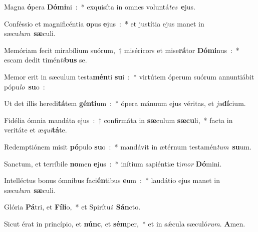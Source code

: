 ﻿\item Magna \textbf{ó}\-pera \textbf{Dó}\-\textbf{mi}\-ni~:~* exquisíta in omnes voluntá\emph{tes}\ \textbf{e}jus.
\item Conféssio et magnificéntia \textbf{o}\-pus \textbf{e}\-jus~:~* et justítia ejus manet in sæcu\emph{lum}\ \textbf{sæ}culi.
\item Memóriam fecit mi\-ra\-bí\-li\-um suórum,~† mi\-sé\-ri\-cors et mi\-se\textbf{rá}\-tor \textbf{Dó}\-\textbf{mi}\-nus~:~* escam dedit timén\emph{ti}\-\textbf{bus} se.
\item Memor erit in sæculum te\-sta\-\textbf{mén}\-ti \textbf{su}\-i~:~* virtútem óperum suórum annuntiábit pópu\emph{lo}\ \textbf{su}o~:
\item Ut det illis heredi\textbf{tá}\-tem \textbf{gén}\-\textbf{ti}\-um~:~* ópera mánuum ejus véritas, et \emph{ju}\textbf{dí}cium.
\item Fidélia ómnia mandáta ejus~:~† confirmáta in \textbf{sæ}\-culum \textbf{sæ}\-\textbf{cu}\-li,~* facta in veritáte et æ\emph{qui}\textbf{tá}te.
\item Redemptiónem misit \textbf{pó}\-pulo \textbf{su}\-o~:~* mandávit in ætérnum testamén\emph{tum}\ \textbf{su}um.
\item Sanctum, et terríbile \textbf{no}\-men \textbf{e}\-jus~:~* inítium sapiéntiæ ti\emph{mor} \textbf{Dó}mini.
\item Intelléctus bonus ómnibus faci\textbf{én}\-tibus \textbf{e}\-um~:~* laudátio ejus manet in sæcu\emph{lum}\ \textbf{sæ}culi.
\item Glória \textbf{Pá}\-tri, et \textbf{Fí}\-\textbf{li}\-o,~* et Spirítu\emph{i}\ \textbf{Sán}cto.
\item Sicut érat in princípio, et \textbf{núnc}, et \textbf{sém}\-per,~* et in sǽcula sæculó\emph{rum}. \textbf{A}men.